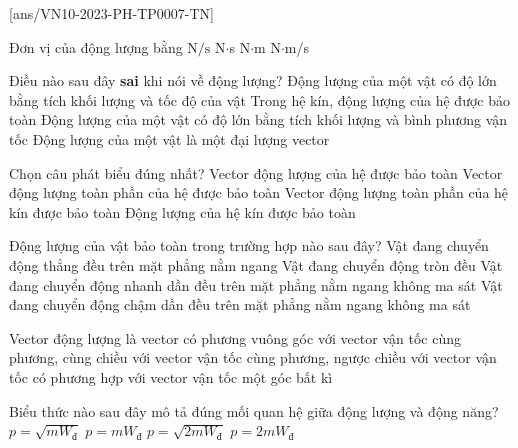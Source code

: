 \let\lesson\undefined
\newcommand{\lesson}{\phantomlesson{Ôn tập chương 7}}
\setcounter{ex}{0}
[ans/VN10-2023-PH-TP0007-TN]
\begin{ex}
Đơn vị của động lượng bằng	
	\choice
	{$\si{\newton/\second}$}
	{\True N$\cdot$s}
	{N$\cdot$m}
	{N$\cdot$m/s}
	\loigiai{}
\end{ex}
	
\begin{ex}
Điều nào sau đây \textbf{sai} khi nói về động lượng?	
	\choice
	{Động lượng của một vật có độ lớn bằng tích khối lượng và tốc độ của vật}
	{Trong hệ kín, động lượng của hệ được bảo toàn}
	{\True Động lượng của một vật có độ lớn bằng tích khối lượng và bình phương vận tốc}
	{Động lượng của một vật là một đại lượng vector}
	\loigiai{}
\end{ex}
\begin{ex}
Chọn câu phát biểu đúng nhất?	
	\choice
	{Vector động lượng của hệ được bảo toàn}
	{Vector động lượng toàn phần của hệ được bảo toàn}
	{\True Vector động lượng toàn phần của hệ kín được bảo toàn}
	{Động lượng của hệ kín được bảo toàn}
	\loigiai{}
\end{ex}
\begin{ex}
	Động lượng của vật bảo toàn trong trường hợp nào sau đây? 
	\choice
	{\True Vật đang chuyển động thẳng đều trên mặt phẳng nằm ngang}
	{Vật đang chuyển động tròn đều}
	{Vật đang chuyển động nhanh dần đều trên mặt phẳng nằm ngang không ma sát}
	{Vật đang chuyển động chậm dần đều trên mặt phẳng nằm ngang không ma sát}
	\loigiai{}
\end{ex}
	\begin{ex}
		Vector động lượng là vector 
		\choice
		{có phương vuông góc với vector vận tốc}
		{\True cùng phương, cùng chiều với vector vận tốc}
		{cùng phương, ngược chiều với vector vận tốc}
		{có phương hợp với vector vận tốc một góc bất kì}
		\loigiai{}
	\end{ex}
\begin{ex}
	Biểu thức nào sau đây mô tả đúng mối quan hệ giữa động lượng và động năng?	
		\choice
		{$p=\sqrt{mW_{\text{đ}}}$}
		{$p=mW_{\text{đ}}$}
		{\True $p=\sqrt{2mW_{\text{đ}}}$}
		{$p=2mW_{\text{đ}}$}
	\end{ex}
